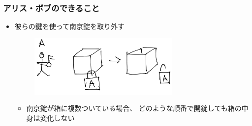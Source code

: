 \begin{frame}
\begin{columns}
\begin{column}{0.4\textwidth}
\begin{figure}[h]
      \end{figure}
    \end{column}
  \end{columns}
\end{frame}

\begin{frame}
  \frametitle{アリス・ボブのできること}

  \begin{itemize}
    \item<+-> 彼らの鍵を使って南京錠を取り外す
    \begin{figure}[h]
      \includegraphics[width=0.7\textwidth]{img/we_can2.png}
    \end{figure}
    \begin{itemize}
      \item<+-> 南京錠が箱に複数ついている場合、
      どのような順番で開錠しても箱の中身は変化しない
    \end{itemize}
  \end{itemize}
\end{frame}

